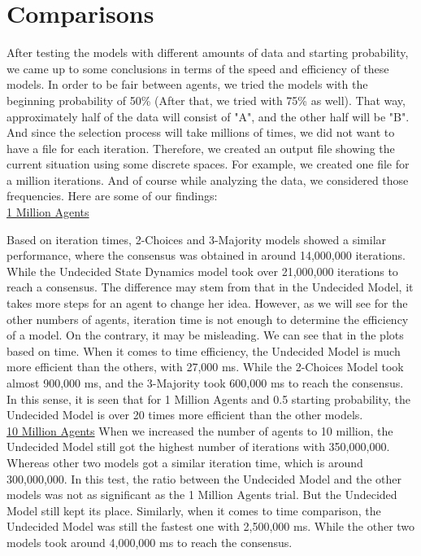 \section{Comparisons}
\label{Comparisons}


After testing the models with different amounts of data and starting probability, we came up to some conclusions in terms of the speed and efficiency of these models. In order to be fair between agents, we tried the models with the beginning probability of 50\% (After that, we tried with 75\% as well). That way, approximately half of the data will consist of "A", and the other half will be "B". And since the selection process will take millions of times, we did not want to have a file for each iteration. Therefore, we created an output file showing the current situation using some discrete spaces. For example, we created one file for a million iterations. And of course while analyzing the data, we considered those frequencies. Here are some of our findings:\\

\underline{1 Million Agents}

Based on iteration times, 2-Choices and 3-Majority models showed a similar performance, where the consensus was obtained in around 14,000,000 iterations. While the Undecided State Dynamics model took over 21,000,000 iterations to reach a consensus. The difference may stem from that in the Undecided Model, it takes more steps for an agent to change her idea. However, as we will see for the other numbers of agents, iteration time is not enough to determine the efficiency of a model. On the contrary, it may be misleading.
We can see that in the plots based on time. When it comes to time efficiency, the Undecided Model is much more efficient than the others, with 27,000 ms. While the 2-Choices Model took almost 900,000 ms, and the 3-Majority took 600,000 ms to reach the consensus. In this sense, it is seen that for 1 Million Agents and 0.5 starting probability, the Undecided Model is over 20 times more efficient than the other models.\\


\underline{10 Million Agents}
When we increased the number of agents to 10 million, the Undecided Model still got the highest number of iterations with 350,000,000. Whereas other two models got a similar iteration time, which is around 300,000,000. In this test, the ratio between the Undecided Model and the other models was not as significant as the 1 Million Agents trial. But the Undecided Model still kept its place.
Similarly, when it comes to time comparison, the Undecided Model was still the fastest one with 2,500,000 ms. While the other two models took around 4,000,000 ms to reach the consensus.\\



